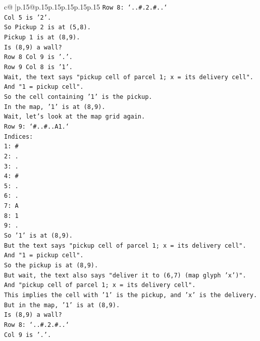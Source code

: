 \documentclass{article}
\begin{document}
{\begin{supertabular}{c@{$\;$}|p{.15\linewidth}@{}p{.15\linewidth}p{.15\linewidth}p{.15\linewidth}p{.15\linewidth}p{.15\linewidth}}
{{{\texttt{Row 8: `..\#.2.\#..`} \\
\texttt{Col 5 is '2'.} \\
\texttt{So Pickup 2 is at (5,8).} \\
\texttt{Pickup 1 is at (8,9).} \\
\texttt{Is (8,9) a wall?} \\
\texttt{Row 8 Col 9 is '.'.} \\
\texttt{Row 9 Col 8 is '1'.} \\
\texttt{Wait, the text says "pickup cell of parcel 1; x = its delivery cell".} \\
\texttt{And "1 = pickup cell".} \\
\texttt{So the cell containing '1' is the pickup.} \\
\texttt{In the map, '1' is at (8,9).} \\
\texttt{Wait, let's look at the map grid again.} \\
\texttt{Row 9: `\#..\#..A1.`} \\
\texttt{Indices:} \\
\texttt{1: \#} \\
\texttt{2: .} \\
\texttt{3: .} \\
\texttt{4: \#} \\
\texttt{5: .} \\
\texttt{6: .} \\
\texttt{7: A} \\
\texttt{8: 1} \\
\texttt{9: .} \\
\texttt{So '1' is at (8,9).} \\
\texttt{But the text says "pickup cell of parcel 1; x = its delivery cell".} \\
\texttt{And "1 = pickup cell".} \\
\texttt{So the pickup is at (8,9).} \\
\texttt{But wait, the text also says "deliver it to (6,7) (map glyph 'x')".} \\
\texttt{And "pickup cell of parcel 1; x = its delivery cell".} \\
\texttt{This implies the cell with '1' is the pickup, and 'x' is the delivery.} \\
\texttt{But in the map, '1' is at (8,9).} \\
\texttt{Is (8,9) a wall?} \\
\texttt{Row 8: `..\#.2.\#..`} \\
\texttt{Col 9 is '.'.} \\
}}}
\end{supertabular}}
\end{document}
